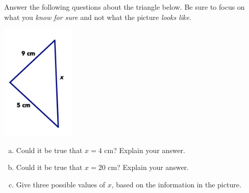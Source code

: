 \begin{problem}
Answer the following questions about the triangle below.  Be sure to focus on what you \emph{know for sure} and not what the picture \emph{looks like}.

\begin{center}
\includegraphics[height=5.5cm]{triineq2}
\end{center}


\begin{enumerate}[(a)]
\item
Could it be true that $x = 4$ cm?  Explain your answer.\\

\item
Could it be true that $x=20$ cm?  Explain your answer.\\

\item
Give three possible values of $x$, based on the information in the picture.\\
\end{enumerate}

\end{problem}

\bigskip


